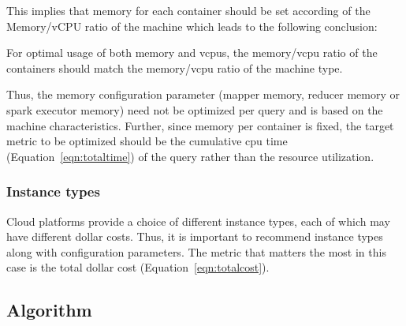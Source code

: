This implies that memory for each container should be set according of the Memory/vCPU ratio of the machine which leads to the following conclusion:
\begin{insight}
	\label{insight:memcpu}
	For optimal usage of both memory and vcpus, the memory/vcpu ratio of the containers should match the memory/vcpu ratio of the machine type.
\end{insight}
Thus, the memory configuration parameter (mapper memory, reducer memory or spark executor memory) need not be optimized per query and is based on the machine characteristics. Further, since memory per container is fixed, the target metric to be optimized should be the cumulative cpu time (Equation~\ref{eqn:totaltime}) of the query rather than the resource utilization. 

\noindent\subsubsection*{Instance types}

Cloud platforms provide a choice of different instance types, each of which may have different dollar costs. Thus, it is important to recommend instance types along with configuration parameters. The metric that matters the most in this case is the total dollar cost (Equation~\ref{eqn:totalcost}).

\subsection{Algorithm}




